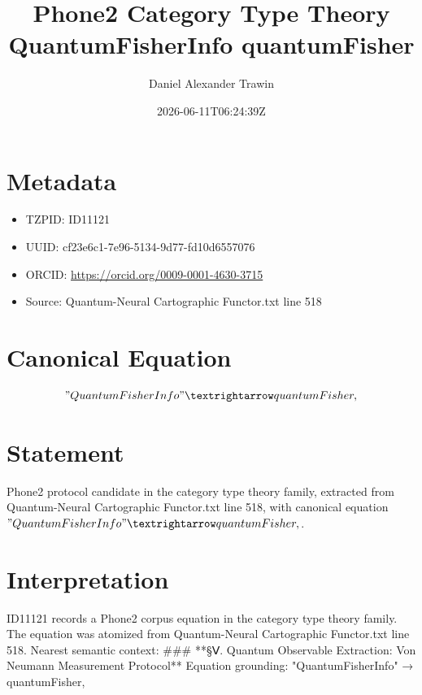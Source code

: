 \documentclass[11pt]{article}
\title{Phone2 Category Type Theory QuantumFisherInfo quantumFisher}
\author{Daniel Alexander Trawin}
\date{2026-06-11T06:24:39Z}
\begin{document}
\maketitle
\section*{Metadata}
\begin{itemize}
\item TZPID: ID11121
\item UUID: cf23e6c1-7e96-5134-9d77-fd10d6557076
\item ORCID: \url{https://orcid.org/0009-0001-4630-3715}
\item Source: Quantum-Neural Cartographic Functor.txt line 518
\end{itemize}
\section*{Canonical Equation}
\[
"QuantumFisherInfo" → quantumFisher,
\]
\section*{Statement}
Phone2 protocol candidate in the category type theory family, extracted from Quantum-Neural Cartographic Functor.txt line 518, with canonical equation $"QuantumFisherInfo" → quantumFisher,$.
\section*{Interpretation}
ID11121 records a Phone2 corpus equation in the category type theory family. The equation was atomized from Quantum-Neural Cartographic Functor.txt line 518. Nearest semantic context: ### **§Ⅴ. Quantum Observable Extraction: Von Neumann Measurement Protocol** Equation grounding: "QuantumFisherInfo" → quantumFisher,
\end{document}
